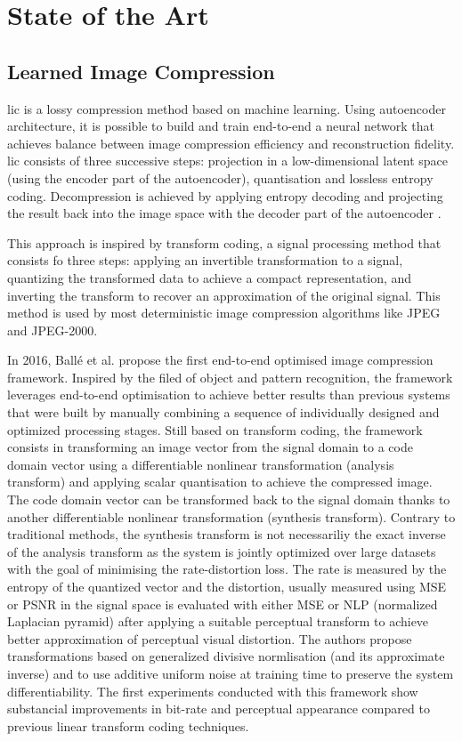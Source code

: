 \chapter{State of the Art}
\label{sota}

\section{Learned Image Compression}
\acrfull{lic} is a lossy compression method based on machine learning. Using autoencoder architecture, it is possible to build and train end-to-end a neural network that achieves balance between image compression efficiency and reconstruction fidelity. \acrshort{lic} consists of three successive steps: projection in a low-dimensional latent space (using the encoder part of the autoencoder), quantisation and lossless entropy coding. Decompression is achieved by applying entropy decoding and projecting the result back into the image space with the decoder part of the autoencoder \cite{licmedium, licstanford}.

This approach is inspired by transform coding, a signal processing method that consists fo three steps: applying an invertible transformation to a signal, quantizing the transformed data to achieve a compact representation, and inverting the transform to recover an approximation of the original signal. This method is used by most deterministic image compression algorithms like JPEG and JPEG-2000.

In 2016, Ballé et al. \cite{ballé2016endtoendoptimizationnonlineartransform} propose the first end-to-end optimised image compression framework. Inspired by the filed of object and pattern recognition, the framework leverages end-to-end optimisation to achieve better results than previous systems that were built by manually combining a sequence of individually designed and optimized processing stages. Still based on transform coding, the framework consists in transforming an image vector from the signal domain to a code domain vector using a differentiable nonlinear transformation (analysis transform) and applying scalar quantisation to achieve the compressed image. The code domain vector can be transformed back to the signal domain thanks to another differentiable nonlinear transformation (synthesis transform). Contrary to traditional methods, the synthesis transform is not necessariliy the exact inverse of the analysis transform as the system is jointly optimized over large datasets with the goal of minimising the rate-distortion loss. The rate is measured by the entropy of the quantized vector and the distortion, usually measured using MSE or PSNR in the signal space is evaluated with either MSE or NLP (normalized Laplacian pyramid) after applying a suitable perceptual transform to achieve better approximation of perceptual visual distortion. The authors propose transformations based on generalized divisive normlisation (and its approximate inverse) and to use additive uniform noise at training time to preserve the system differentiability. The first experiments conducted with this framework show substancial improvements in bit-rate and perceptual appearance compared to previous linear transform coding techniques.

